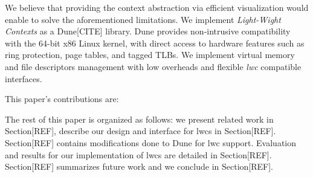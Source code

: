 We believe that providing the context abstraction via efficient visualization would enable
to solve the aforementioned limitations.
We implement \textit{Light-Wight Contexts} as a Dune[CITE] library.
Dune provides non-intrusive compatibility with the 64-bit x86 Linux kernel, with direct access
to hardware features such as ring protection, page tables, and tagged TLBs.
We implement virtual memory and file descriptors management with low overheads and flexible \textit{lwc} compatible interfaces.

This paper's contributions are: 

The rest of this paper is organized as follows: we present related work in Section[REF], describe 
our design and interface for lwcs in Section[REF]. Section[REF] contains modifications done to Dune for lwc support.
Evaluation and results for our implementation of lwcs are detailed in Section[REF].
Section[REF] summarizes future work and we conclude in Section[REF].


